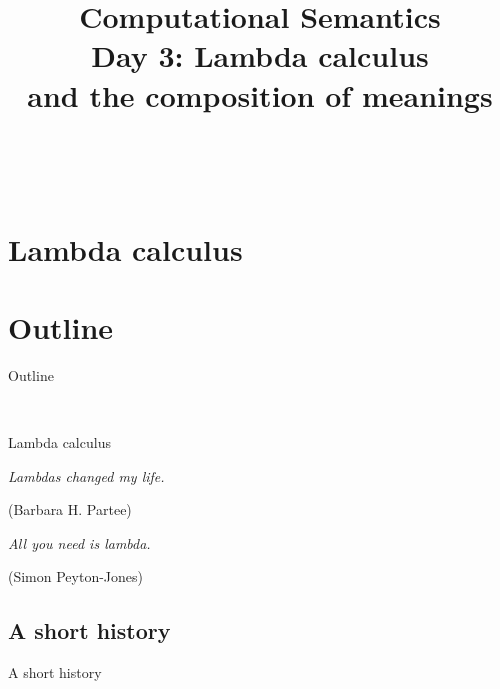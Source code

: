 \documentclass[xcolor=dvipsnames]{beamer}
\title[Computational Semantics]{Computational Semantics\\ Day 3: Lambda calculus\\ and the composition of meanings}
\begin{document}
\lstset{language=Haskell,basicstyle=\footnotesize\ttfamily,frame=single,showstringspaces=false}


\begin{frame}{\ \ }
\titlepage
\end{frame}


\section{Lambda calculus}


\section*{Outline}
\begin{frame}{Outline}
\tableofcontents
\end{frame}


\begin{frame}{\ \ }

\begin{center}
{\Large Lambda calculus}

\vspace{1cm}

{\footnotesize
\parbox{6cm}{{\em\large Lambdas changed my life.}\begin{flushright}(Barbara H. Partee)\end{flushright} }

\parbox{6cm}{{\em\large All you need is lambda.}\begin{flushright}(Simon Peyton-Jones)\end{flushright} }
}
\end{center}
\end{frame}

\subsection{A short history}

\begin{frame}{}

\begin{center}
{\Large A short history}
\end{center}
\end{frame}
\end{document}
